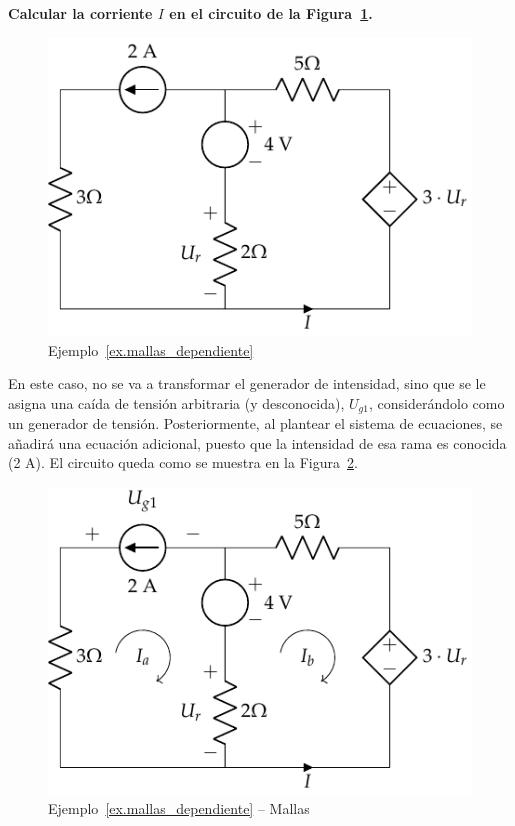 \documentclass[11pt]{book} %
\begin{document}
	\begin{example}\label{ex.mallas_dependiente}
	    \textbf{Calcular la corriente $I$ en el circuito de la Figura~\ref{fig.ejemplo_mallas_dependiente}.}
	    \begin{figure}[H]
	        \centering
	        \includegraphics{../figs/ejemplo_mallas_dependiente.pdf}
	        \caption{Ejemplo~\ref{ex.mallas_dependiente}}
	        \label{fig.ejemplo_mallas_dependiente}
	    \end{figure}
	    
	    En este caso, no se va a transformar el generador de intensidad, sino que se le asigna una caída de tensión arbitraria (y desconocida), $U_{g1}$, considerándolo como un generador de tensión. Posteriormente, al plantear el sistema de ecuaciones, se añadirá una ecuación adicional, puesto que la intensidad de esa rama es conocida (2 A). El circuito queda como se muestra en la Figura~\ref{fig.mallas_dpendiente_sol}.
	    \begin{figure}[H]
	        \centering
	        \includegraphics{../figs/ejemplo_mallas_dependiente_sol.pdf}
	        \caption{Ejemplo~\ref{ex.mallas_dependiente} -- Mallas}
	        \label{fig.mallas_dpendiente_sol}
	    \end{figure}
	    

\end{example}
\end{document}
